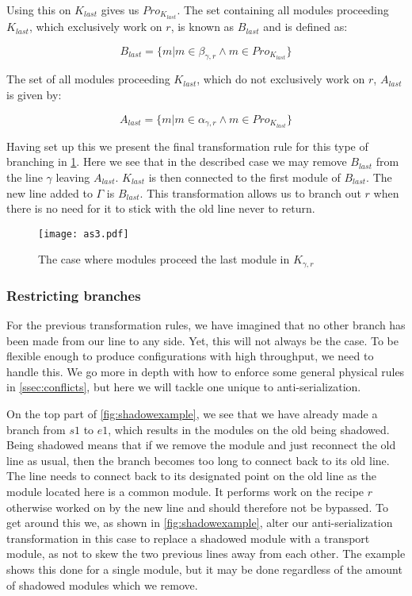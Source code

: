Using this on $K_{last}$ gives us $Pro_{K_{last}}$. The set containing all modules proceeding $K_{last}$, which exclusively work on $r$, is known as $B_{last}$ and is defined as:

\[B_{last} = \{m | m \in \beta_{\gamma ,r}  \land m \in Pro_{K_{last}} \}\]

The set of all modules proceeding $K_{last}$, which do not exclusively work on $r$, $A_{last}$ is given by:

\[ A_{last} = \{m | m \in \alpha_{\gamma ,r}  \land m \in Pro_{K_{last}} \} \]

Having set up this we present the final transformation rule for this type of branching in \cref{fig:asbranchout}. Here we see that in the described case we may remove $B_{last}$ from the line $\gamma$ leaving  $A_{last}$. $K_{last}$ is then connected to the first module of $B_{last}$. The new line added to $\Gamma$ is $B_{last}$. This transformation allows us to branch out $r$ when there is no need for it to stick with the old line never to return.


\begin{figure}[h]
\centering
\texttt{[image: as3.pdf]}
\caption{The case where modules proceed the last module in $K_{\gamma ,r}$}
\label{fig:asbranchout}
\end{figure}

\subsubsection{Restricting branches}
For the previous transformation rules, we have imagined that no other branch has been made from our line to any side. Yet, this will not always be the case. To be flexible enough to produce configurations with high throughput, we need to handle this. We go more in depth with how to enforce some general physical rules in \cref{ssec:conflicts}, but here we will tackle one unique to anti-serialization.

On the top part of \cref{fig:shadowexample}, we see that we have already made a branch from $s1$ to $e1$, which results in the modules on the old being shadowed. Being shadowed means that if we remove the module and just reconnect the old line as usual, then the branch becomes too long to connect back to its old line. The line needs to connect back to its designated point on the old line as the module located here is a common module. It performs work on the recipe $r$ otherwise worked on by the new line and should therefore not be bypassed.  To get around this we, as shown in \cref{fig:shadowexample}, alter our anti-serialization transformation in this case to replace a shadowed module with a transport module, as not to skew the two previous lines away from each other. The example shows this done for a single module, but it may be done regardless of the amount of shadowed modules which we remove.


